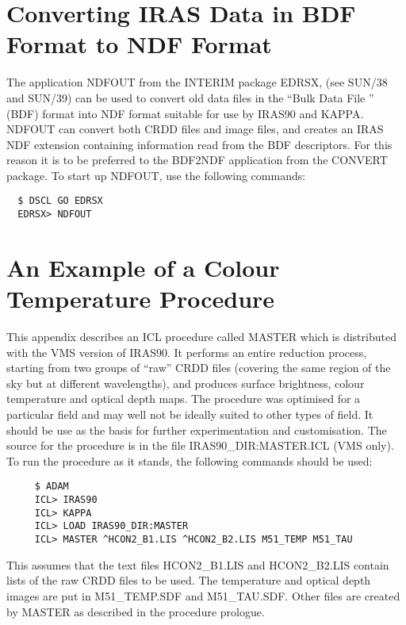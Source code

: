 \section{Converting IRAS Data in BDF Format to NDF Format}
The application {\small NDFOUT} from the {\small INTERIM} package
{\small EDRSX}, (see SUN/38 and SUN/39) can be used to convert old data
files in the ``Bulk Data File '' ({\small BDF}) format into {\small
NDF} format suitable for use by  {\small IRAS90} and {\small KAPPA}.
{\small NDFOUT} can convert both {\small CRDD} files and image files,
and creates an {\small IRAS NDF} extension containing information read
from  the {\small BDF} descriptors. For this reason  it is to be
preferred to the {\small BDF2NDF} application from the {\small CONVERT}
package. To start up {\small NDFOUT}, use the following commands:

\small
\begin{verbatim}
  $ DSCL GO EDRSX
  EDRSX> NDFOUT
\end{verbatim}
\normalsize

\section{An Example of a Colour Temperature Procedure}
\label{APP:MAS}
This appendix describes an {\small ICL} procedure called {\small MASTER}
which is distributed with the {\small VMS} version of {\small IRAS90}. It 
performs an entire reduction process, starting from two groups of ``raw'' 
{\small CRDD} files (covering the same region of the sky but at different 
wavelengths), and produces surface brightness, colour temperature and optical
depth maps. The procedure was optimised for a particular field and may well
not be ideally suited to other types of field. It should be use as the 
basis for further experimentation and customisation. The source for the
procedure is in the file {\small IRAS90\_DIR:MASTER.ICL} ({\small VMS} only).
To run the procedure as it stands, the following commands should be used:

\small
\begin{verbatim}
     $ ADAM
     ICL> IRAS90
     ICL> KAPPA
     ICL> LOAD IRAS90_DIR:MASTER
     ICL> MASTER ^HCON2_B1.LIS ^HCON2_B2.LIS M51_TEMP M51_TAU
\end{verbatim}
\normalsize

This assumes that the text files {\small HCON2\_B1.LIS} and {\small HCON2\_B2.LIS} 
contain lists of the raw {\small CRDD} files to be used. The temperature and 
optical depth images are put in {\small M51\_TEMP.SDF} and {\small M51\_TAU.SDF}. Other
files are created by {\small MASTER} as described in the procedure prologue.


